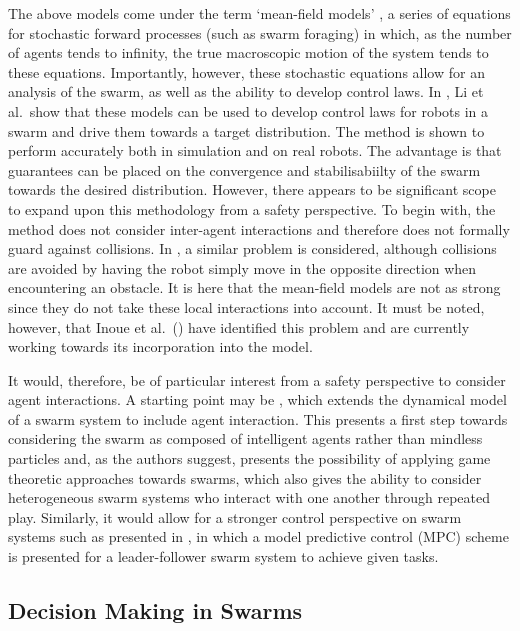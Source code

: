 \documentclass[.../main.tex]{subfiles}
\begin{document}
The above models come under the term `mean-field models’
\cite{Elamvazhuthi2019b}, a series of equations for stochastic forward
processes (such as swarm foraging) in which, as the number of agents
tends to infinity, the true macroscopic motion of the system tends to
these equations.  Importantly, however, these stochastic equations
allow for an analysis of the swarm, as well as the ability to develop
control laws. In \cite{Li2017}, Li et al.~show that these models can
be used to develop control laws for robots in a swarm and drive them
towards a target distribution. The method is shown to perform
accurately both in simulation and on real robots. The advantage is
that guarantees can be placed on the convergence and stabilisabiilty
of the swarm towards the desired distribution. However, there appears
to be significant scope to expand upon this methodology from a safety
perspective. To begin with, the method does not consider inter-agent
interactions and therefore does not formally guard against
collisions. In \cite{Inoue2019}, a similar problem is considered,
although collisions are avoided by having the robot simply move in the
opposite direction when encountering an obstacle. It is here that the
mean-field models are not as strong since they do not take these local
interactions into account. It must be noted, however, that Inoue et
al.~() have identified this problem and are
currently working towards its incorporation into the model.

It would, therefore, be of particular interest from a safety
perspective to consider agent interactions. A starting point may be
\cite{Bellomo2017}, which extends the dynamical model of a swarm system
to include agent interaction. This presents a first step towards
considering the swarm as composed of intelligent agents rather than
mindless particles and, as the authors suggest, presents the
possibility of applying game theoretic approaches towards swarms,
which also gives the ability to consider heterogeneous swarm systems
who interact with one another through repeated play.  Similarly, it
would allow for a stronger control perspective on swarm systems such
as presented in \cite{Borzi2015}, in which a model predictive control
(MPC) scheme is presented for a leader-follower swarm system to
achieve given tasks.


\subsection{Decision Making in Swarms} \label{sec::Decisions_in_Swarms}
\end{document}

